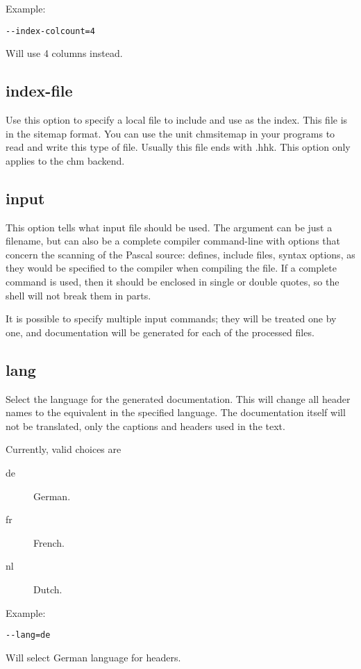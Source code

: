 Example:
\begin{verbatim}
--index-colcount=4
\end{verbatim}
Will use 4 columns instead.

\subsection{index-file}
\label{suse:index-file}
Use this option to specify a local file to include and use as the index. This 
file is in the sitemap format. You can use the unit chmsitemap in your 
programs to read and write this type of file. Usually this file ends with .hhk. 
This option only applies to the chm backend.

\subsection{input}
\label{suse:input}
This option tells \fpdoc what input file should be used. The argument can 
be just a filename, but can also be a complete compiler command-line with 
options that concern the scanning of the Pascal source: defines, include 
files, syntax options, as they would be specified to the \fpc compiler 
when compiling the file. If a complete command is used, then it should be 
enclosed in single or double quotes, so the shell will not break them in 
parts.

It is possible to specify multiple input commands; they will be treated one
by one, and documentation will be generated for each of the processed files.

\subsection{lang}
\label{suse:lang}
Select the language for the generated documentation. This will change all
header names to the equivalent in the specified language. The documentation
itself will not be translated, only the captions and headers used in the
text.

Currently, valid choices are
\begin{description}
\item[de] German.
\item[fr] French.
\item[nl] Dutch.
\end{description}

Example:
\begin{verbatim}
--lang=de
\end{verbatim}
Will select German language for headers.

